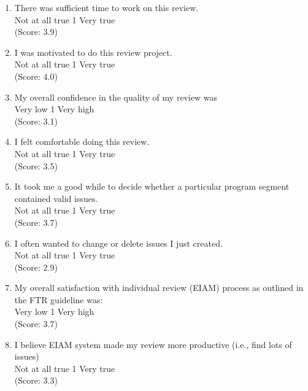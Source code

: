 \begin{enumerate}
\item   There was sufficient time to work on this review.
\\
Not at all true \hfill 1     \hfill Very true\\
(Score: 3.9)

\item   I was motivated to do this review project.
\\
Not at all true \hfill 1     \hfill Very true\\
(Score: 4.0)

\item  My overall confidence in the quality of my review was
\\
Very low \hfill 1     \hfill Very high\\
(Score: 3.1)

\item  I felt comfortable doing this review.
\\
Not at all true \hfill 1     \hfill Very true\\
(Score: 3.5)

\item  It took me a good while to decide whether a particular program
segment contained valid issues.
\\
Not at all true \hfill 1     \hfill Very true\\
(Score: 3.7)

\item  I often wanted to change or delete issues I just created.
\\
Not at all true \hfill 1     \hfill Very true\\
(Score: 2.9)

\item  My overall satisfaction with individual review (EIAM) process as
outlined in the FTR guideline was:
\\
Very low \hfill 1     \hfill Very high\\
(Score: 3.7)

\item  I believe EIAM system made my review more productive (i.e., find
lots of issues) 
\\
Not at all true \hfill 1     \hfill Very true\\
(Score: 3.3)


\end{enumerate}
